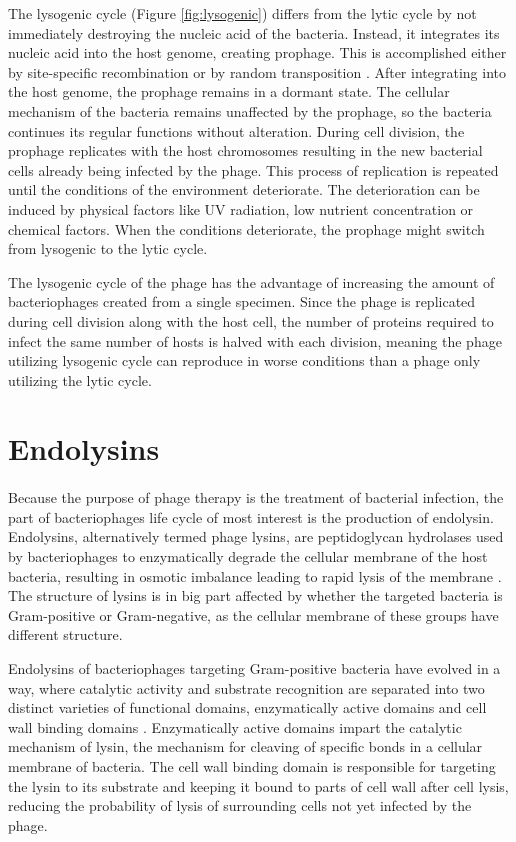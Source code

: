The lysogenic cycle (Figure \ref{fig:lysogenic}) differs from the lytic cycle by not immediately destroying the nucleic acid of the bacteria. Instead, it integrates its nucleic acid into the host genome, creating prophage. This is accomplished either by site-specific recombination or by random transposition \cite{guttman2005basic}. After integrating into the host genome, the prophage remains in a dormant state. The cellular mechanism of the bacteria remains unaffected by the prophage, so the bacteria continues its regular functions without alteration. During cell division, the prophage replicates with the host chromosomes resulting in the new bacterial cells already being infected by the phage. This process of replication is repeated until the conditions of the environment deteriorate. The deterioration can be induced by physical factors like UV radiation, low nutrient concentration or chemical factors. When the conditions deteriorate, the prophage might switch from lysogenic to the lytic cycle. 

The lysogenic cycle of the phage has the advantage of increasing the amount of bacteriophages created from a single specimen. Since the phage is replicated during cell division along with the host cell, the number of proteins required to infect the same number of hosts is halved with each division, meaning the phage utilizing lysogenic cycle can reproduce in worse conditions than a phage only utilizing the lytic cycle.


\section{Endolysins}
\paragraph*{}
Because the purpose of phage therapy is the treatment of bacterial infection, the part of bacteriophages life cycle of most interest is the production of endolysin. Endolysins, alternatively termed phage lysins, are peptidoglycan hydrolases used by bacteriophages to enzymatically degrade the cellular membrane of the host bacteria, resulting in osmotic imbalance leading to rapid lysis of the membrane \cite{schmelcher2012bacteriophage}. The structure of lysins is in big part affected by whether the targeted bacteria is Gram-positive or Gram-negative, as the cellular membrane of these groups have different structure. 

Endolysins of bacteriophages targeting Gram-positive bacteria have evolved in a way, where catalytic activity and substrate recognition are separated into two distinct varieties of functional domains, enzymatically active domains and cell wall binding domains \cite{schmelcher2012bacteriophage}. Enzymatically active domains impart the catalytic mechanism of lysin, the mechanism for cleaving of specific bonds in a cellular membrane of bacteria. The cell wall binding domain is responsible for targeting the lysin to its substrate and keeping it bound to parts of cell wall after cell lysis, reducing the probability of lysis of surrounding cells not yet infected by the phage.

